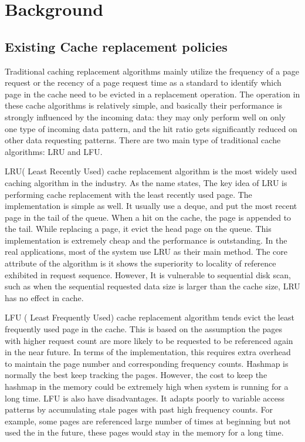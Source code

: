\documentclass[letterpaper,twocolumn,10pt]{article}
\begin{document}
\section{Background}

\subsection{Existing Cache replacement policies}
Traditional caching replacement algorithms mainly utilize the frequency of a page request or the recency of a page request time as a standard to identify which page in the cache need to be evicted in a replacement operation. The operation in these cache algorithms is relatively simple, and basically their performance is strongly influenced by the incoming data: they may only perform well on only one type of incoming data pattern, and the hit ratio gets significantly reduced on other data requesting patterns. There are two main type of traditional cache algorithms: LRU and LFU.

LRU( Least Recently Used) cache replacement algorithm is the most widely used caching algorithm in the industry. As the name states, The key idea of LRU is performing cache replacement with the least recently used page. The implementation is simple as well. It usually use a deque, and put the most recent page in the tail of the queue. When a hit on the cache, the page is appended to the tail. While replacing a page, it evict the head page on the queue. This implementation is extremely cheap and the performance is outstanding. In the real applications, most of the system use LRU as their main method. The core attribute of the algorithm is it shows the superiority to locality of reference exhibited in request sequence. However, It is vulnerable to sequential disk scan, such as when the sequential requested data size is larger than the cache size, LRU has no effect in cache. 

LFU ( Least Frequently Used) cache replacement algorithm tends evict the least frequently used page in the cache. This is based on the assumption the pages with higher request count are more likely to be requested to be referenced again in the near future. In terms of the implementation, this requires extra overhead to maintain the page number and corresponding frequency counts. Hashmap is normally the best keep tracking the pages. However, the cost to keep the hashmap in the memory could be extremely high when system is running for a long time. LFU is also have disadvantages. It adapts poorly to variable access patterns by accumulating stale pages with past high frequency counts. For example, some pages are referenced large number of times at beginning but not used the in the future, these pages would stay in the memory for a long time. 
\end{document}
